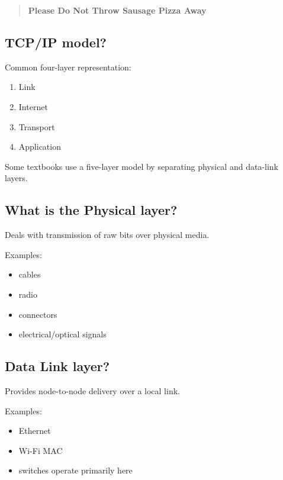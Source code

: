 \begin{quote}
\textbf{Please Do Not Throw Sausage Pizza Away}\\
\end{quote}

\medskip

\subsection{TCP/IP model?}

Common four-layer representation:

\begin{enumerate}
  \item Link
  \item Internet
  \item Transport
  \item Application
\end{enumerate}

Some textbooks use a five-layer model by separating physical and data-link layers.

\medskip

\subsection{What is the Physical layer?}

Deals with transmission of raw bits over physical media.

Examples:

\begin{itemize}
  \item cables
  \item radio
  \item connectors
  \item electrical/optical signals
\end{itemize}

\medskip

\subsection{Data Link layer?}

Provides node-to-node delivery over a local link.

Examples:

\begin{itemize}
  \item Ethernet
  \item Wi-Fi MAC
  \item switches operate primarily here
\end{itemize}

